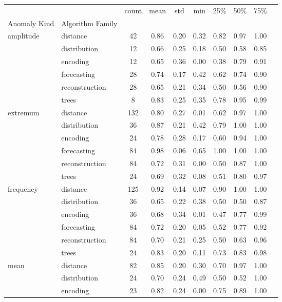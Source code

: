 \begin{tabular}{|l|l|c|c|c|c|c|c|c|c|}
\toprule
 &  & count & mean & std & min & 25\% & 50\% & 75\% \\
Anomaly Kind & Algorithm Family &  &  &  &  &  &  &  \\
\midrule
\multirow[t]{6}{*}{amplitude} & distance & 42 & 0.86 & 0.20 & 0.32 & 0.82 & 0.97 & 1.00 \\
 & distribution & 12 & 0.66 & 0.25 & 0.18 & 0.50 & 0.58 & 0.85 \\
 & encoding & 12 & 0.65 & 0.36 & 0.00 & 0.38 & 0.79 & 0.91 \\
 & forecasting & 28 & 0.74 & 0.17 & 0.42 & 0.62 & 0.74 & 0.90 \\
 & reconstruction & 28 & 0.65 & 0.21 & 0.34 & 0.50 & 0.56 & 0.90 \\
 & trees & 8 & 0.83 & 0.25 & 0.35 & 0.78 & 0.95 & 0.99 \\
\cline{1-9}
\multirow[t]{6}{*}{extremum} & distance & 132 & 0.80 & 0.27 & 0.01 & 0.62 & 0.97 & 1.00 \\
 & distribution & 36 & 0.87 & 0.21 & 0.42 & 0.79 & 1.00 & 1.00 \\
 & encoding & 24 & 0.78 & 0.28 & 0.17 & 0.60 & 0.94 & 1.00 \\
 & forecasting & 84 & 0.98 & 0.06 & 0.65 & 1.00 & 1.00 & 1.00 \\
 & reconstruction & 84 & 0.72 & 0.31 & 0.00 & 0.50 & 0.87 & 1.00 \\
 & trees & 24 & 0.69 & 0.32 & 0.08 & 0.51 & 0.80 & 0.97 \\
\cline{1-9}
\multirow[t]{6}{*}{frequency} & distance & 125 & 0.92 & 0.14 & 0.07 & 0.90 & 1.00 & 1.00 \\
 & distribution & 36 & 0.65 & 0.22 & 0.38 & 0.50 & 0.50 & 0.87 \\
 & encoding & 36 & 0.68 & 0.34 & 0.01 & 0.47 & 0.77 & 0.99 \\
 & forecasting & 84 & 0.72 & 0.20 & 0.05 & 0.52 & 0.77 & 0.92 \\
 & reconstruction & 84 & 0.70 & 0.21 & 0.25 & 0.50 & 0.63 & 0.96 \\
 & trees & 24 & 0.83 & 0.20 & 0.11 & 0.73 & 0.83 & 0.98 \\
\cline{1-9}
\multirow[t]{6}{*}{mean} & distance & 82 & 0.85 & 0.20 & 0.30 & 0.70 & 0.97 & 1.00 \\
 & distribution & 24 & 0.70 & 0.24 & 0.49 & 0.50 & 0.52 & 1.00 \\
 & encoding & 23 & 0.82 & 0.24 & 0.00 & 0.75 & 0.89 & 1.00 \\

\end{tabular}
